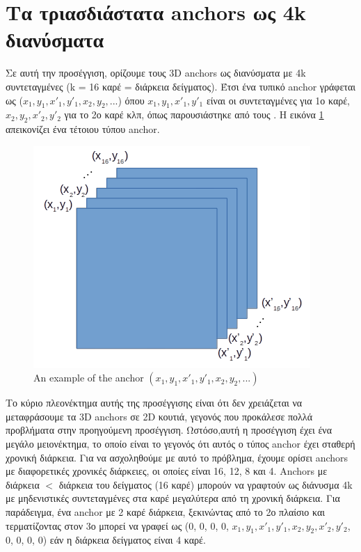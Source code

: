\documentclass{report}
\begin{document}
\section{Τα τριασδιάστατα anchors ως 4k διανύσματα}
Σε αυτή την προσέγγιση, ορίζουμε τους 3D anchors ως διανύσματα με 4k συντεταγμένες (k = 16 καρέ = διάρκεια δείγματος). Έτσι ένα τυπικό anchor γράφεται ως ($x_1, y_1, x'_1, y'_1, x_2, y_2, ...$)
όπου $x_1, y_1, x'_1, y'_1 $ είναι οι συντεταγμένες για 1ο καρέ, $x_2, y_2, x'_2, y'_2$ για το 2ο καρέ κλπ, όπως παρουσιάστηκε από τους \cite{DBLP:journals/corr/abs-1712-09184}. 
Η εικόνα \ref{fig:anchor_4k} απεικονίζει ένα τέτοιου τύπου anchor.

\begin{figure}[h]
  \centering
  \includegraphics[scale=0.5]{anchor_4k}
  \caption{An example of the anchor $(x_1,y_1,x'_1,y'_1,x_2,y_2, ...)$}
  \label{fig:anchor_4k}
\end{figure}

Το κύριο πλεονέκτημα αυτής της προσέγγισης είναι ότι δεν χρειάζεται να μεταφράσουμε τα 3D anchors  σε 2D κουτιά, γεγονός που προκάλεσε πολλά προβλήματα στην προηγούμενη προσέγγιση.
Ωστόσο,αυτή η προσέγγιση έχει ένα μεγάλο μειονέκτημα, το οποίο είναι το γεγονός ότι αυτός ο τύπος anchor έχει σταθερή χρονική διάρκεια.
Για να ασχοληθούμε με αυτό το πρόβλημα, έχουμε ορίσει anchors με διαφορετικές χρονικές διάρκειες, οι οποίες είναι 16, 12, 8 και 4.
Anchors με διάρκεια $<$  διάρκεια του δείγματος (16 καρέ) μπορούν  να γραφτούν ως διάνυσμα 4k με μηδενιστικές συντεταγμένες στα καρέ μεγαλύτερα από τη χρονική διάρκεια. Για παράδειγμα, ένα anchor με
2 καρέ διάρκεια, ξεκινώντας από το 2ο πλαίσιο και τερματίζοντας στον 3ο μπορεί να γραφεί ως (0, 0, 0, 0, $x_1, y_1, x'_1, y'_1, x_2, y_2, x'_2, y'_2$, 0, 0, 0, 0)  εάν η διάρκεια δείγματος
 είναι 4 καρέ. 
\end{document}
